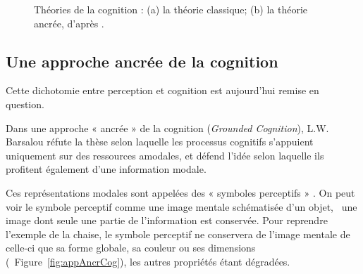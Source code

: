 \begin{figure}[t]
         \myfloatalign
         \par
        \caption[Théories de la cognition.]{Théories de la cognition : (a) la théorie classique; (b) la théorie ancrée, d'après \citep{barsalou1999perceptions}.}
        \label{fig:appCog}
\end{figure}

\subsection{Une approche ancrée de la cognition}
\label{sec:ch3_groundedCognition}
 
Cette dichotomie entre perception et cognition est aujourd'hui remise en question. 

Dans une approche « ancrée » de la cognition (\emph{Grounded Cognition}), L.W. Barsalou réfute la thèse selon laquelle les processus cognitifs s'appuient uniquement sur des ressources amodales, et défend l'idée selon laquelle ils profitent également d'une information modale.

Ces représentations modales sont appelées des « symboles perceptifs » \citep{barsalou1999perceptions}. On peut voir le symbole perceptif comme une image mentale schématisée d'un objet, \ie~une image dont seule une partie de l'information est conservée. Pour reprendre l'exemple de la chaise, le symbole perceptif ne conservera de l'image mentale de celle-ci que sa forme globale, sa couleur ou ses dimensions (\cf~Figure~\ref{fig:appAncrCog}), les autres propriétés étant dégradées. 

